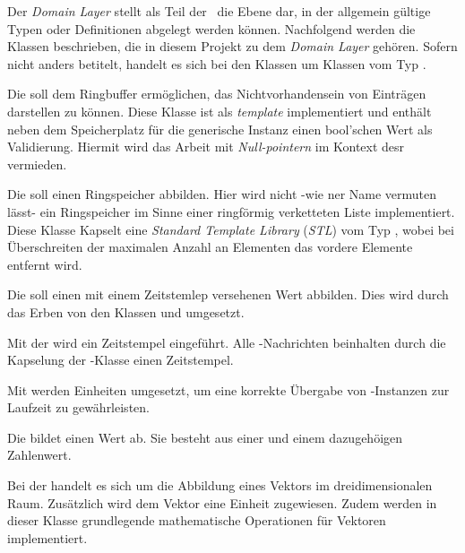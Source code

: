 
Der \textit{Domain Layer} stellt als Teil der \clean\ die Ebene dar, in der allgemein gültige Typen oder Definitionen abgelegt werden können. Nachfolgend werden die Klassen beschrieben, die in diesem Projekt zu dem \textit{Domain Layer} gehören. Sofern nicht anders betitelt, handelt es sich bei den Klassen um Klassen vom Typ \VO.


Die  soll dem Ringbuffer ermöglichen, das Nichtvorhandensein von Einträgen darstellen zu können. Diese Klasse ist als \textit{template} implementiert und enthält neben dem Speicherplatz für die generische Instanz einen bool'schen Wert als Validierung.
Hiermit wird das Arbeit mit \textit{Null-pointern} im Kontext desr  vermieden.


Die  soll einen Ringspeicher abbilden. Hier wird nicht -wie ner Name vermuten lässt- ein Ringspeicher im Sinne einer ringförmig verketteten Liste implementiert. Diese Klasse Kapselt eine \textit{Standard Template Library} (\textit{STL}) vom Typ , wobei bei Überschreiten der maximalen Anzahl an Elementen das vordere Elemente entfernt wird.\\


Die  soll einen mit einem Zeitstemlep versehenen Wert abbilden. Dies wird durch das Erben von den Klassen  und  umgesetzt.


Mit der  wird ein Zeitstempel eingeführt. Alle \ROS-Nachrichten beinhalten durch die Kapselung der -Klasse einen Zeitstempel.


Mit  werden Einheiten umgesetzt, um eine korrekte Übergabe von -Instanzen zur Laufzeit zu gewährleisten.


Die  bildet einen Wert ab. Sie besteht aus einer  und einem dazugehöigen Zahlenwert.


Bei der  handelt es sich um die Abbildung eines Vektors im dreidimensionalen Raum. Zusätzlich wird dem Vektor eine Einheit zugewiesen.
Zudem werden in dieser Klasse grundlegende mathematische Operationen für Vektoren implementiert.


